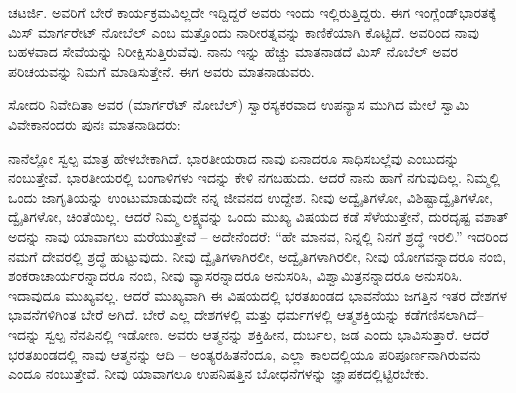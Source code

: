 ಚಟರ್ಜಿ. ಅವರಿಗೆ ಬೇರೆ ಕಾರ್ಯಕ್ರಮವಿಲ್ಲದೇ ಇದ್ದಿದ್ದರೆ ಅವರು ಇಂದು ಇಲ್ಲಿರುತ್ತಿದ್ದರು. ಈಗ ಇಂಗ್ಲೆಂಡ್​ ಭಾರತಕ್ಕೆ ಮಿಸ್​ ಮಾರ್ಗರೇಟ್​ ನೋಬೆಲ್​ ಎಂಬ ಮತ್ತೊಂದು ನಾರೀರತ್ನವನ್ನು ಕಾಣಿಕೆಯಾಗಿ ಕೊಟ್ಟಿದೆ. ಅವರಿಂದ ನಾವು ಬಹಳವಾದ ಸೇವೆಯನ್ನು ನಿರೀಕ್ಷಿಸುತ್ತಿರುವೆವು. ನಾನು ಇನ್ನು ಹೆಚ್ಚು ಮಾತನಾಡದೆ ಮಿಸ್​ ನೊಬೆಲ್​ ಅವರ ಪರಿಚಯವನ್ನು ನಿಮಗೆ ಮಾಡಿಸುತ್ತೇನೆ. ಈಗ ಅವರು ಮಾತನಾಡುವರು. 

ಸೋದರಿ ನಿವೇದಿತಾ ಅವರ (ಮಾರ್ಗರೆಟ್​ ನೋಬೆಲ್​) ಸ್ವಾರಸ್ಯಕರವಾದ ಉಪನ್ಯಾಸ ಮುಗಿದ ಮೇಲೆ ಸ್ವಾಮಿ ವಿವೇಕಾನಂದರು ಪುನಃ ಮಾತನಾಡಿದರು:

ನಾನೆಲ್ಲೋ ಸ್ವಲ್ಪ ಮಾತ್ರ ಹೇಳಬೇಕಾಗಿದೆ. ಭಾರತೀಯರಾದ ನಾವು ಏನಾದರೂ ಸಾಧಿಸಬಲ್ಲೆವು ಎಂಬುದನ್ನು ನಂಬುತ್ತೇವೆ. ಭಾರತೀಯರಲ್ಲಿ ಬಂಗಾಳಿಗಳು ಇದನ್ನು ಕೇಳಿ ನಗಬಹುದು. ಆದರೆ ನಾನು ಹಾಗೆ ನಗುವುದಿಲ್ಲ. ನಿಮ್ಮಲ್ಲಿ ಒಂದು ಜಾಗೃತಿಯನ್ನು ಉಂಟುಮಾಡುವುದೇ ನನ್ನ ಜೀವನದ ಉದ್ದೇಶ. ನೀವು ಅದ್ವೈತಿಗಳೋ, ವಿಶಿಷ್ಟಾದ್ವೈತಿಗಳೋ, ದ್ವೈತಿಗಳೋ, ಚಿಂತೆಯಿಲ್ಲ. ಆದರೆ ನಿಮ್ಮ ಲಕ್ಷ್ಯವನ್ನು ಒಂದು ಮುಖ್ಯ ವಿಷಯದ ಕಡೆ ಸೆಳೆಯುತ್ತೇನೆ, ದುರದೃಷ್ಟ ವಶಾತ್​ ಅದನ್ನು ನಾವು ಯಾವಾಗಲು ಮರೆಯುತ್ತೇವೆ – ಅದೇನೆಂದರೆ: “ಹೇ ಮಾನವ, ನಿನ್ನಲ್ಲಿ ನಿನಗೆ ಶ್ರದ್ಧೆ ಇರಲಿ.” ಇದರಿಂದ ನಮಗೆ ದೇವರಲ್ಲಿ ಶ್ರದ್ಧೆ ಹುಟ್ಟುವುದು. ನೀವು ದ್ವೈತಿಗಳಾಗಿರಲೀ, ಅದ್ವೈತಿಗಳಾಗಿರಲೀ, ನೀವು ಯೋಗವನ್ನಾದರೂ ನಂಬಿ, ಶಂಕರಾಚಾರ್ಯರನ್ನಾದರೂ ನಂಬಿ, ನೀವು ವ್ಯಾಸರನ್ನಾದರೂ ಅನುಸರಿಸಿ, ವಿಶ್ವಾಮಿತ್ರನನ್ನಾದರೂ ಅನುಸರಿಸಿ. ಇದಾವುದೂ ಮುಖ್ಯವಲ್ಲ. ಆದರೆ ಮುಖ್ಯವಾಗಿ ಈ ವಿಷಯದಲ್ಲಿ ಭರತಖಂಡದ ಭಾವನೆಯು ಜಗತ್ತಿನ ಇತರ ದೇಶಗಳ ಭಾವನೆಗಳಿಗಿಂತ ಬೇರೆ ಅಗಿದೆ. ಬೇರೆ ಎಲ್ಲ ದೇಶಗಳಲ್ಲಿ ಮತ್ತು ಧರ್ಮಗಳಲ್ಲಿ ಆತ್ಮಶಕ್ತಿಯನ್ನು ಕಡೆಗಣಿಸಲಾಗಿದೆ–ಇದನ್ನು ಸ್ವಲ್ಪ ನೆನಪಿನಲ್ಲಿ ಇಡೋಣ. ಅವರು ಆತ್ಮನನ್ನು ಶಕ್ತಿಹೀನ, ದುರ್ಬಲ, ಜಡ ಎಂದು ಭಾವಿಸುತ್ತಾರೆ. ಆದರೆ ಭರತಖಂಡದಲ್ಲಿ ನಾವು ಆತ್ಮನನ್ನು ಆದಿ – ಅಂತ್ಯರಹಿತನೆಂದೂ, ಎಲ್ಲಾ ಕಾಲದಲ್ಲಿಯೂ ಪರಿಪೂರ್ಣನಾಗಿರುವನು ಎಂದೂ ನಂಬುತ್ತೇವೆ. ನೀವು ಯಾವಾಗಲೂ ಉಪನಿಷತ್ತಿನ ಬೋಧನೆಗಳನ್ನು ಜ್ಞಾಪಕದಲ್ಲಿಟ್ಟಿರಬೇಕು. 


